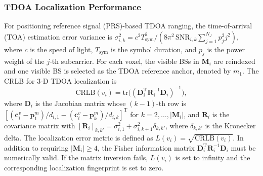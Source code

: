 \documentclass[10pt,journal,letterpaper]{IEEEtran}
\begin{document}
\subsubsection{TDOA Localization Performance}
For positioning reference signal (PRS)-based TDOA ranging, the time-of-arrival (TOA) estimation error variance is $\sigma_{i,k}^2=c^2T_{\mathrm{sym}}^2/(8\pi^2\,\mathrm{SNR}_{i,k}\sum_{j=1}^{N_J}p_j^2j^2)$, where $c$ is the speed of light, $T_{\mathrm{sym}}$ is the symbol duration, and $p_j$ is the power weight of the $j$-th subcarrier. For each voxel, the visible BSs in $\mathbf{M}_i$ are reindexed and one visible BS is selected as the TDOA reference anchor, denoted by $m_1$. The CRLB for 3-D TDOA localization is~\cite{ref16}
\begin{equation}
\mathrm{CRLB}(v_i)=\mathrm{tr}\big((\mathbf{D}_i^{\mathrm{T}}\mathbf{R}_i^{-1}\mathbf{D}_i)^{-1}\big),
\end{equation}
where $\mathbf{D}_i$ is the Jacobian matrix whose $(k-1)$-th row is $[(\mathbf{c}_i^v-\mathbf{p}_1^m)/d_{i,1}-(\mathbf{c}_i^v-\mathbf{p}_k^m)/d_{i,k}]^{\mathrm{T}}$ for $k=2,\ldots,|\mathbf{M}_i|$, and $\mathbf{R}_i$ is the covariance matrix with $[\mathbf{R}_i]_{k,k'}=\sigma_{i,1}^2+\sigma_{i,k+1}^2\delta_{k,k'}$, where $\delta_{k,k'}$ is the Kronecker delta. The localization error metric is defined as $L(v_i)=\sqrt{\mathrm{CRLB}(v_i)}$. In addition to requiring $|\mathbf{M}_i|\ge4$, the Fisher information matrix $\mathbf{D}_i^{\mathrm{T}}\mathbf{R}_i^{-1}\mathbf{D}_i$ must be numerically valid. If the matrix inversion fails, $L(v_i)$ is set to infinity and the corresponding localization fingerprint is set to zero.
\end{document}
